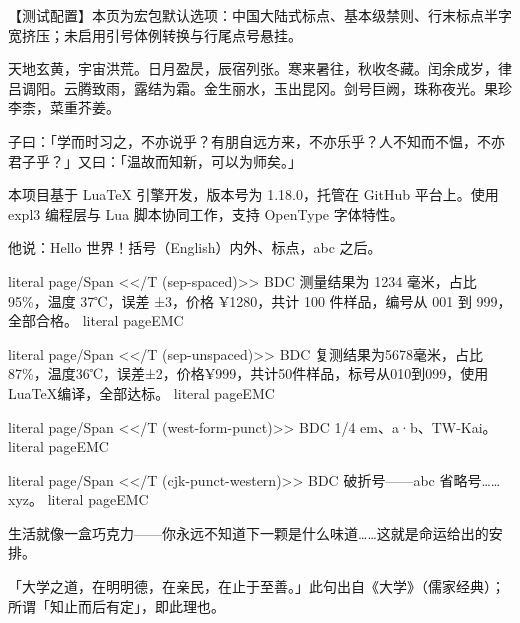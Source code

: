 \documentclass[12pt]{article}
\newcommand\用例[2]{%
  \leavevmode
  \pdfextension literal page{/Span <</T (#1)>> BDC}%
  #2%
  \pdfextension literal page{EMC}%
}
\begin{document}
{\small 【测试配置】本页为宏包默认选项：中国大陆式标点、基本级禁则、行末标点半字宽挤压；未启用引号体例转换与行尾点号悬挂。}

天地玄黄，宇宙洪荒。日月盈昃，辰宿列张。寒来暑往，秋收冬藏。闰余成岁，律吕调阳。云腾致雨，露结为霜。金生丽水，玉出昆冈。剑号巨阙，珠称夜光。果珍李柰，菜重芥姜。

子曰：「学而时习之，不亦说乎？有朋自远方来，不亦乐乎？人不知而不愠，不亦君子乎？」又曰：「温故而知新，可以为师矣。」

本项目基于 LuaTeX 引擎开发，版本号为 1.18.0，托管在 GitHub 平台上。使用 expl3 编程层与 Lua 脚本协同工作，支持 OpenType 字体特性。

他说：Hello 世界！括号（English）内外、标点，abc 之后。

\用例{sep-spaced}{测量结果为 1234 毫米，占比 95\%，温度 37℃，误差 ±3，价格 ¥1280，共计 100 件样品，编号从 001 到 999，全部合格。}

\用例{sep-unspaced}{复测结果为5678毫米，占比87\%，温度36℃，误差±2，价格¥999，共计50件样品，标号从010到099，使用LuaTeX编译，全部达标。}

\用例{west-form-punct}{1/4 em、a·b、TW-Kai。}

\用例{cjk-punct-western}{破折号——abc 省略号……xyz。}

生活就像一盒巧克力——你永远不知道下一颗是什么味道……这就是命运给出的安排。

「大学之道，在明明德，在亲民，在止于至善。」此句出自《大学》（儒家经典）；所谓「知止而后有定」，即此理也。

\begingroup
\linespread{1.6}\selectfont
\end{document}
